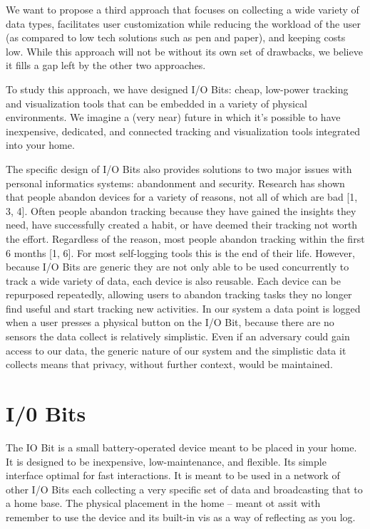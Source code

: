 \documentclass[sigchi-a, authorversion]{acmart}
\begin{document}
We want to propose a third approach that focuses on collecting a wide variety of data types, facilitates user customization while reducing the workload of the user (as compared to low tech solutions such as pen and paper), and keeping costs low. While this approach will not be without its own set of drawbacks, we believe it fills a gap left by the other two approaches.


To study this approach, we have designed I/O Bits: cheap, low-power tracking and visualization tools that can be embedded in a variety of physical environments.  We imagine a (very near) future in which it’s possible to have inexpensive, dedicated, and connected tracking and visualization tools integrated into your home.

The specific design of I/O Bits also provides solutions to two major issues with personal informatics systems: abandonment and security. Research has shown that people abandon devices for a variety of reasons, not all of which are bad [1, 3, 4]. Often people abandon tracking because they have gained the insights they need, have successfully created a habit, or have deemed their tracking not worth the effort. Regardless of the reason, most people abandon tracking within the first 6 months [1, 6]. For most self-logging tools this is the end of their life. However, because I/O Bits are generic they are not only able to be used concurrently to track a wide variety of data, each device is also reusable. Each device can be repurposed repeatedly, allowing users to abandon tracking tasks they no longer find useful and start tracking new activities. In our system a data point is logged when a user presses a physical button on the I/O Bit, because there are no sensors the data collect is relatively simplistic. Even if an adversary could gain access to our data, the generic nature of our system and the simplistic data it collects means that privacy, without further context, would be maintained.


\section{I/0 Bits}
The IO Bit is a small battery-operated device meant to be placed in your home. It is designed to be inexpensive, low-maintenance, and flexible. Its simple interface optimal for fast interactions. It is meant to be used in a network of other I/O Bits each collecting a very specific set of data and broadcasting that to a home base. The physical placement in the home – meant ot assit with remember to use the device and its built-in vis as a way of reflecting as you log. 
\end{document}
